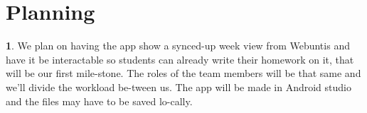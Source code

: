 \documentclass[12pt]{article}
\theoremstyle{definition}
\newtheorem{ourVersion}{ \linebreak}
\begin{document}
\pagebreak

\section{Planning}

\begin{ourVersion}
We plan on having the app show a synced-up week view from Webuntis and have it be interactable 
so students can already write their homework on it, that will be our first mile-stone. 
The roles of the team members will be that same and we’ll divide the workload be-tween us. 
The app will be made in Android studio and the files may have to be saved lo-cally.
\end{ourVersion}
\end{document}
